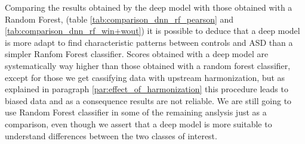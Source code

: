 \documentclass[10pt]{report}
\begin{document}
Comparing the results obtained by the deep model with those obtained with a Random Forest, (table \ref{tab:comparison_dnn_rf_pearson} and \ref{tab:comparison_dnn_rf_win+wout}) it is possible to deduce that a deep model is more adapt to find characteristic patterns between controls and ASD than a simpler Ranfom Forest classifier.
Scores obtained with a deep model are systematically way higher than those obtained with a random forest classifier, except for those we get cassifying data with upstream harmonization, but as explained in paragraph \ref{par:effect_of_harmonization} this procedure leads to biased data and as a consequence results are not reliable.
We are still going to use Random Forest classifier in some of the remaining anslysis just as a comparison, even though we assert that a deep model is more suitable to understand differences between the two classes of interest.
\end{document}

